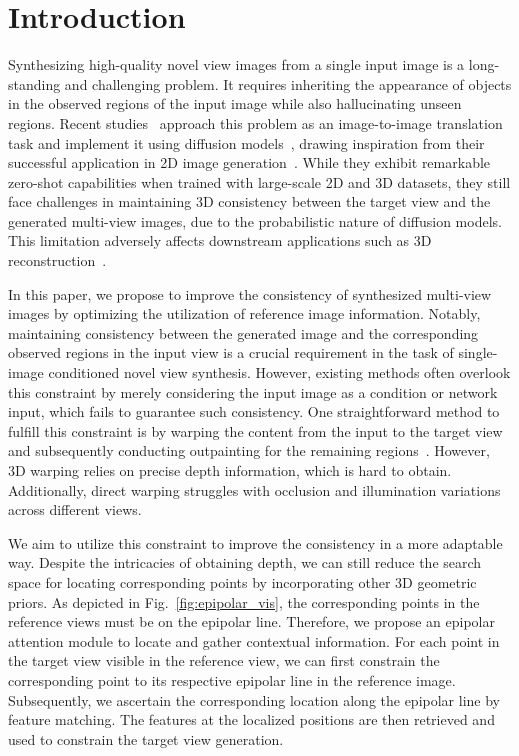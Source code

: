 \vspace{-6mm}

\section{Introduction}
\label{sec:intro}

Synthesizing high-quality novel view images from a single input image is a long-standing and challenging problem. It requires inheriting the appearance of objects in the observed regions of the input image while also hallucinating unseen regions. Recent studies~\cite{3dim, zero123} approach this problem as an image-to-image translation task and implement it using diffusion models~\cite{diffusion, ddim}, drawing inspiration from their successful application in 2D image generation~\cite{stable-diffusion, imagen}.	
While they exhibit remarkable zero-shot capabilities when trained with large-scale 2D and 3D datasets, they still face challenges in maintaining 3D consistency between the target view and the generated multi-view images, due to the probabilistic nature of diffusion models. This limitation adversely affects downstream applications such as 3D reconstruction~\cite{dreamfusion, neus}.

In this paper, we propose to improve the consistency of synthesized multi-view images by optimizing the utilization of reference image information. 
Notably, maintaining consistency between the generated image and the corresponding observed regions in the input view is a crucial requirement in the task of single-image conditioned novel view synthesis. 
However, existing methods often overlook this constraint by merely considering the input image as a condition or network input, which fails to guarantee such consistency. 
One straightforward method to fulfill this constraint is by warping the content from the input to the target view and subsequently conducting outpainting for the remaining regions~\cite{text2nerf, xiang20233d}.
However, 3D warping relies on precise depth information, which is hard to obtain.
Additionally, direct warping struggles with occlusion and illumination variations across different views.

We aim to utilize this constraint to improve the consistency in a more adaptable way.
Despite the intricacies of obtaining depth, we can still reduce the search space for locating corresponding points by incorporating other 3D geometric priors. 
As depicted in Fig.~\ref{fig:epipolar_vis}, the corresponding points in the reference views must be on the epipolar line.
Therefore, we propose an epipolar attention module to locate and gather contextual information. 
For each point in the target view visible in the reference view, we can first constrain the corresponding point to its respective epipolar line in the reference image. Subsequently, we ascertain the corresponding location along the epipolar line by feature matching.
The features at the localized positions are then retrieved and used to constrain the target view generation.

